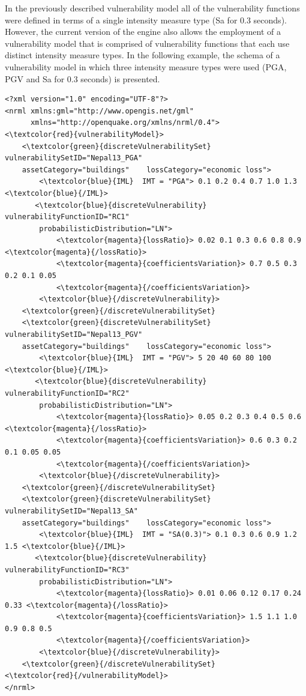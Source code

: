 In the previously described \gls{vulnerability model} all of the \glspl{vulnerability function} were defined in terms of a single intensity measure type (Sa for 0.3 seconds). However, the current version of the engine also allows the employment of a \gls{vulnerability model} that is comprised of \glspl{vulnerability function} that each use distinct intensity measure types. In the following example, the schema of a \gls{vulnerability model} in which three intensity measure types were used (PGA, PGV and Sa for 0.3 seconds) is presented.

\begin{Verbatim}[frame=single, commandchars=\\\{\}, samepage=false]
<?xml version="1.0" encoding="UTF-8"?>
<nrml xmlns:gml="http://www.opengis.net/gml"
      xmlns="http://openquake.org/xmlns/nrml/0.4">
<\textcolor{red}{vulnerabilityModel}>
    <\textcolor{green}{discreteVulnerabilitySet} vulnerabilitySetID="Nepal13_PGA"
    assetCategory="buildings"    lossCategory="economic loss">
        <\textcolor{blue}{IML}  IMT = "PGA"> 0.1 0.2 0.4 0.7 1.0 1.3 <\textcolor{blue}{/IML}>
       <\textcolor{blue}{discreteVulnerability}  vulnerabilityFunctionID="RC1" 
        probabilisticDistribution="LN">
            <\textcolor{magenta}{lossRatio}> 0.02 0.1 0.3 0.6 0.8 0.9 <\textcolor{magenta}{/lossRatio}>
            <\textcolor{magenta}{coefficientsVariation}> 0.7 0.5 0.3 0.2 0.1 0.05 
            <\textcolor{magenta}{/coefficientsVariation}>
        <\textcolor{blue}{/discreteVulnerability}>
    <\textcolor{green}{/discreteVulnerabilitySet} 
    <\textcolor{green}{discreteVulnerabilitySet} vulnerabilitySetID="Nepal13_PGV"
    assetCategory="buildings"    lossCategory="economic loss">
        <\textcolor{blue}{IML}  IMT = "PGV"> 5 20 40 60 80 100 <\textcolor{blue}{/IML}>
       <\textcolor{blue}{discreteVulnerability}  vulnerabilityFunctionID="RC2" 
        probabilisticDistribution="LN">
            <\textcolor{magenta}{lossRatio}> 0.05 0.2 0.3 0.4 0.5 0.6 <\textcolor{magenta}{/lossRatio}>
            <\textcolor{magenta}{coefficientsVariation}> 0.6 0.3 0.2 0.1 0.05 0.05 
            <\textcolor{magenta}{/coefficientsVariation}>
        <\textcolor{blue}{/discreteVulnerability}>
    <\textcolor{green}{/discreteVulnerabilitySet} 
    <\textcolor{green}{discreteVulnerabilitySet} vulnerabilitySetID="Nepal13_SA"
    assetCategory="buildings"    lossCategory="economic loss">
        <\textcolor{blue}{IML}  IMT = "SA(0.3)"> 0.1 0.3 0.6 0.9 1.2 1.5 <\textcolor{blue}{/IML}>
       <\textcolor{blue}{discreteVulnerability}  vulnerabilityFunctionID="RC3" 
        probabilisticDistribution="LN">
            <\textcolor{magenta}{lossRatio}> 0.01 0.06 0.12 0.17 0.24 0.33 <\textcolor{magenta}{/lossRatio}>
            <\textcolor{magenta}{coefficientsVariation}> 1.5 1.1 1.0 0.9 0.8 0.5 
            <\textcolor{magenta}{/coefficientsVariation}>
        <\textcolor{blue}{/discreteVulnerability}>
    <\textcolor{green}{/discreteVulnerabilitySet} 
<\textcolor{red}{/vulnerabilityModel}>  
</nrml>      
\end{Verbatim}

